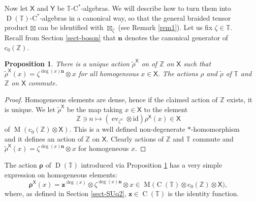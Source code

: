 \documentclass[12pt,reqno,a4paper]{amsart}
\newtheorem{proposition}{Proposition}[section]
\theoremstyle{definition}
\newcommand{\cst}{\ensuremath{\mathrm{C}^*}}
\newcommand{\id}{\mathrm{id}}
\newcommand{\tens}{\otimes}
\newcommand{\TT}{\mathbb{T}}
\newcommand{\ZZ}{\mathbb{Z}}
\newcommand{\sX}{\mathsf{X}}
\newcommand{\sY}{\mathsf{Y}}
\newcommand{\brho}{{\boldsymbol{\rho}}}
\newcommand{\bn}{{\boldsymbol{n}}}
\newcommand{\bz}{{\boldsymbol{z}}}
\DeclareMathOperator{\C}{C}
\DeclareMathOperator{\D}{D}
\DeclareMathOperator{\M}{M}
\numberwithin{equation}{section}
\begin{document}
\begin{appendices}
Now let $\sX$ and $\sY$ be $\TT$-\cst-algebras. We will describe how to turn them into $\D(\TT)$-\cst-algebras in a canonical way, so that the general braided tensor product $\boxtimes$ can be identified with $\boxtimes_\zeta$ (see Remark \ref{rem1}). Let us fix $\zeta\in\TT$. Recall from Section \ref{sect-boson} that $\bn$ denotes the canonical generator of $\mathrm{c}_0(\ZZ)$.

\begin{proposition}\label{prop-lemma1}
There is a unique action $\tilde{\rho}^\sX$ on of $\ZZ$ on $\sX$ such that $\tilde{\rho}^{\sX}(x)=\zeta^{\deg(x)\bn}\tens x$ for all homogeneous $x\in\sX$. The actions $\rho$ and $\tilde{\rho}$ of $\TT$ and $\ZZ$ on $\sX$ commute.
\end{proposition}

\begin{proof}
Homogeneous elements are dense, hence if the claimed action of $\ZZ$ exists, it is unique. We let $\tilde{\rho}^\sX$ be the map taking $x\in\sX$ to the element
\[
\ZZ\ni n\longmapsto(\operatorname{ev}_{\zeta^n}\tens\id)\rho^\sX(x)\in\sX
\]
of $\M(\mathrm{c}_0(\ZZ)\tens\sX)$.
This is a well defined non-degenerate $*$-homomorphism and it defines an action of $\ZZ$ on $\sX$. Clearly actions of $\ZZ$ and $\TT$ commute and $\tilde{\rho}^\sX(x)=\zeta^{\deg(x)\bn}\tens x$ for homogeneous $x$.
\end{proof}

The action $\brho$ of $\D(\TT)$ introduced via Proposition \ref{prop-lemma1} has a very simple expression on homogeneous elements:
\[
\brho^\sX(x)
=\bz^{\deg(x)}\tens\zeta^{\deg(x)\bn}\tens x\in\M\bigl(\C(\TT)\tens\mathrm{c}_0(\ZZ)\tens\sX\bigr),
\]
where, as defined in Section \ref{sect-SUq2}, $\bz\in\C(\TT)$ is the identity function.


\end{appendices}
\end{document}
